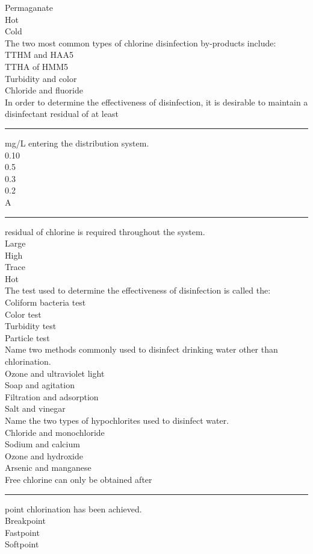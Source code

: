 Permaganate\\
Hot\\
Cold\\
The two most common types of chlorine disinfection by-products include:\\
TTHM and HAA5\\
TTHA of HMM5\\
Turbidity and color\\
Chloride and fluoride\\
In order to determine the effectiveness of disinfection, it is desirable to maintain a disinfectant residual of at least \rule{1cm}{0.5pt}  mg/L entering the distribution system.\\
0.10\\
0.5\\
0.3\\
0.2\\
A \rule{1cm}{0.5pt}  residual of chlorine is required throughout the system.\\
Large\\
High\\
Trace\\
Hot\\
The test used to determine the effectiveness of disinfection is called the:\\
Coliform bacteria test\\
Color test\\
Turbidity test\\
Particle test\\
Name two methods commonly used to disinfect drinking water other than chlorination.\\
Ozone and ultraviolet light\\
Soap and agitation\\
Filtration and adsorption\\
Salt and vinegar\\
Name the two types of hypochlorites used to disinfect water.\\
Chloride and monochloride\\
Sodium and calcium\\
Ozone and hydroxide\\
Arsenic and manganese\\
Free chlorine can only be obtained after \rule{1cm}{0.5pt}  point chlorination has been achieved.\\
Breakpoint\\
Fastpoint\\
Softpoint\\
